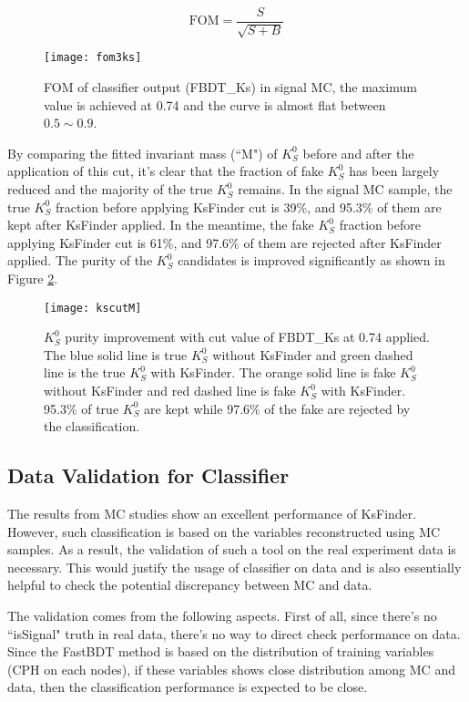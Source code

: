 \begin{equation}\label{eq:fom}
	\text{FOM} = \frac{S}{\sqrt{S+B}}
\end{equation}

\begin{figure}[H]
	\centering
	\texttt{[image: fom3ks]}
	\caption{FOM of classifier output (FBDT\_Ks) in signal MC, the maximum value is achieved at 0.74 and the curve is almost flat between $0.5\sim 0.9$.}
	\label{fig:ks_fom}
\end{figure}

By comparing the fitted invariant mass (``M") of $K_S^0$ before and after the application of this cut, it's clear that the fraction of fake $K_S^0$ has been largely reduced and the majority of the true $K_S^0$ remains. In the signal MC sample, the true $K_S^0$ fraction before applying KsFinder cut is 39\%, and 95.3\% of them are kept after KsFinder applied. In the meantime, the fake $K_S^0$ fraction before applying KsFinder cut is 61\%, and 97.6\% of them are rejected after KsFinder applied. The purity of the $K_S^0$ candidates is improved significantly as shown in Figure \ref{fig:ks_cutused}.

\begin{figure}[htpb]
	\centering
	\texttt{[image: kscutM]}
	\caption{$K_S^0$ purity improvement with cut value of FBDT\_Ks at 0.74 applied. The blue solid line is true $K_S^0$ without KsFinder and green dashed line is the true $K_S^0$ with KsFinder. The orange solid line is fake $K_S^0$ without KsFinder and red dashed line is fake $K_S^0$ with KsFinder. 95.3\% of true $K_S^0$ are kept while 97.6\% of the fake are rejected by the classification. }
	\label{fig:ks_cutused}
\end{figure}

\subsection{Data Validation for Classifier}
The results from MC studies show an excellent performance of KsFinder. However, such classification is based on the variables reconstructed using MC samples. As a result, the validation of such a tool on the real experiment data is necessary. This would justify the usage of classifier on data and is also essentially helpful to check the potential discrepancy between MC and data. 

The validation comes from the following aspects. First of all, since there's no ``isSignal" truth in real data, there's no way to direct check performance on data. Since the FastBDT method is based on the distribution of training variables (CPH on each nodes), if these variables shows close distribution among MC and data, then the classification performance is expected to be close.

